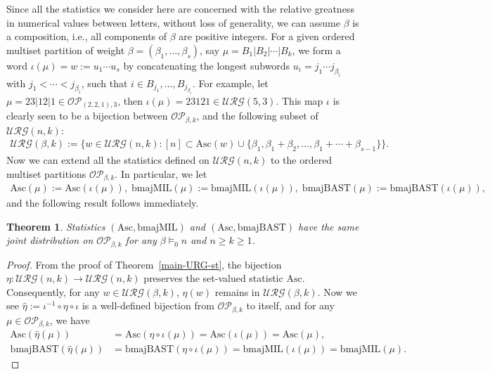 \documentclass[12pt]{amsart}
\numberwithin{equation}{section}
\theoremstyle{plain}
\newtheorem{theorem}{Theorem}[section]
\theoremstyle{definition}
\def\bmajMIL{\mathrm{bmajMIL}}
\def\bmajBAST{\mathrm{bmajBAST}}
\def\Asc{\mathrm{Asc}}
\def\URG{\mathcal{URG}}
\def\OP{\mathcal{OP}}
\begin{document}
Since all the statistics we consider here are concerned with the relative greatness in numerical values between letters, without loss of generality, we can assume $\beta$ is a composition, i.e., all components of $\beta$ are positive integers. For a given ordered multiset partition of weight $\beta=(\beta_1,\ldots,\beta_s)$, say $\mu=B_1|B_2|\cdots|B_k$, we form a word $\iota(\mu)=w:=u_1\cdots u_s$ by concatenating the longest subwords $u_i=j_1\cdots j_{\beta_i}$ with $j_1<\cdots<j_{\beta_i}$, such that $i\in B_{j_1},\ldots,B_{j_{\beta_i}}$. For example, let $\mu=23|12|1\in\OP_{(2,2,1),3}$, then $\iota(\mu)=23121\in\URG(5,3)$. This map $\iota$ is clearly seen to be a bijection between $\OP_{\beta,k}$, and the following subset of $\URG(n,k)$:
\begin{align*}
\URG(\beta,k):=\{w\in\URG(n,k) : [n]\subset \Asc(w)\cup\{\beta_1,\beta_1+\beta_2,\ldots,\beta_1+\cdots+\beta_{s-1}\}\}.
\end{align*}
Now we can extend all the statistics defined on $\URG(n,k)$ to the ordered multiset partitions $\OP_{\beta,k}$. In particular, we let
\begin{align*}
\Asc(\mu):=\Asc(\iota(\mu)),\; \bmajMIL(\mu):=\bmajMIL(\iota(\mu)),\; \bmajBAST(\mu):=\bmajBAST(\iota(\mu)),
\end{align*}
and the following result follows immediately.
\begin{theorem}\label{main-betaURG}
Statistics $(\Asc,\bmajMIL)$ and $(\Asc,\bmajBAST)$ have the same joint distribution on $\OP_{\beta,k}$ for any $\beta\models_0 n$ and $n\ge k\ge 1$.
\end{theorem}
\begin{proof}
From the proof of Theorem~\ref{main-URG-st}, the bijection $\eta: \URG(n,k)\rightarrow\URG(n,k)$ preserves the set-valued statistic $\Asc$. Consequently, for any $w\in\URG(\beta,k)$, $\eta(w)$ remains in $\URG(\beta,k)$. Now we see $\hat{\eta}:=\iota^{-1}\circ\eta\circ\iota$ is a well-defined bijection from $\OP_{\beta,k}$ to itself, and for any $\mu\in\OP_{\beta,k}$, we have
\begin{align*}
\Asc(\hat{\eta}(\mu))&=\Asc(\eta\circ\iota(\mu))=\Asc(\iota(\mu))=\Asc(\mu),\\
\bmajBAST(\hat{\eta}(\mu))&=\bmajBAST(\eta\circ\iota(\mu))=\bmajMIL(\iota(\mu))=\bmajMIL(\mu).
\end{align*}
\end{proof}
\end{document}
